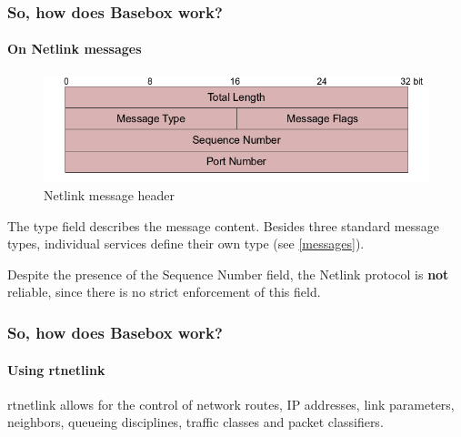\documentclass[11pt]{beamer}
\begin{document}
\begin{frame}
\frametitle{So, how does Basebox work?}
\framesubtitle{On Netlink messages}

\begin{minipage}[t]{0.48\linewidth}
\centering
\begin{figure}
\includegraphics[scale=0.3]{nlmsghdr.png}
\caption{Netlink message header}
\end{figure}
\end{minipage}
\begin{minipage}[t]{0.48\linewidth}

The type field describes the message content. Besides three standard message types, individual services define their own type (see \ref{messages}).

\pause 

Despite the presence of the Sequence Number field, the Netlink protocol is \textbf{not} reliable, since there is no strict enforcement of this field.

\end{minipage}
\end{frame}

\begin{frame}
\frametitle{So, how does Basebox work?}
\framesubtitle{Using rtnetlink}



rtnetlink allows for the control of network routes, IP addresses, link parameters, neighbors, queueing disciplines, traffic classes and packet classifiers.

\end{frame}
\end{document}

